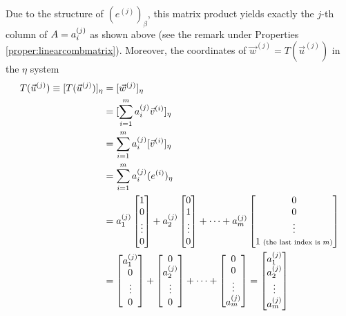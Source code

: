 Due to the structure of $(e^{(j)})_\beta$, this matrix product yields exactly the $j$-th column of $A = \smash{a_i^{(j)}}$ as shown above (see the remark under Properties \ref{proper:linearcombmatrix}). Moreover, the coordinates of $\vec{w}^{(j)} = T(\vec{u}^{(j)})$ in the $\mathcal{\eta}$ system
\begin{align*}
T(\vec{u}^{(j)}) \equiv [T(\vec{u}^{(j)})]_\eta &= [\vec{w}^{(j)}]_\eta \\
&= [\sum_{i=1}^{m} a_i^{(j)}\vec{v}^{(i)}]_\eta \\
&= \sum_{i=1}^{m} a_i^{(j)}[\vec{v}^{(i)}]_\eta \\
&= \sum_{i=1}^{m} a_i^{(j)}(e^{(i)})_\eta \\
&=  a_1^{(j)} \begin{bmatrix}
1 \\
0 \\
\vdots \\
0
\end{bmatrix}
+
a_2^{(j)} \begin{bmatrix}
0 \\
1 \\
\vdots \\
0
\end{bmatrix}
+ \cdots
+
a_m^{(j)} \begin{bmatrix}
0 \\
0 \\
\vdots \\
1 {\scriptsize \text{ (the last index is $m$)}}
\end{bmatrix}
\\
&= \begin{bmatrix}
a_1^{(j)} \\
0 \\
\vdots \\
0
\end{bmatrix}
+
\begin{bmatrix}
0 \\
a_2^{(j)} \\
\vdots \\
0
\end{bmatrix}
+ \cdots
+
\begin{bmatrix}
0 \\
0 \\
\vdots \\
a_m^{(j)}
\end{bmatrix}
=
\begin{bmatrix}
a_1^{(j)} \\
a_2^{(j)} \\
\vdots \\
a_m^{(j)}
\end{bmatrix}
\end{align*}
